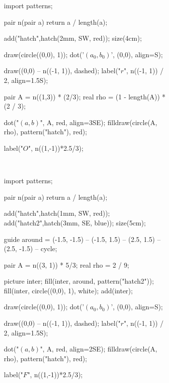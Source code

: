 \begin{figure}[H]
	\centering
	\begin{subfigure}{4cm}
		\centering
		\begin{asy}
			import patterns;

			pair n(pair a) {return a / length(a);}

			add("hatch",hatch(2mm, SW, red));
			size(4cm);

			draw(circle((0,0), 1));
			dot('$(a_0, b_0)$', (0,0), align=S);

			draw((0,0) -- n((-1, 1)), dashed);
			label("$r$", n((-1, 1)) / 2, align=1.5S);

			pair A = n((1,3)) * (2/3);
			real rho = (1 - length(A)) * (2 / 3);

			dot("$(a,b)$", A, red, align=3SE);
			filldraw(circle(A, rho), pattern("hatch"), red);

			label("$O$", n((1,-1))*2.5/3);
		\end{asy}
	\end{subfigure}
	\begin{subfigure}{1cm}
		\centering~\\
	\end{subfigure}
	\begin{subfigure}{5cm}
		\centering
		\begin{asy}
			import patterns;

			pair n(pair a) {return a / length(a);}

			add("hatch",hatch(1mm, SW, red));
			add("hatch2",hatch(3mm, SE, blue));
			size(5cm);

			guide around = (-1.5, -1.5) -- (-1.5, 1.5) -- (2.5, 1.5) -- (2.5, -1.5) -- cycle;

			pair A = n((3, 1)) * 5/3; 
			real rho = 2 / 9;

			picture inter;
			fill(inter, around, pattern("hatch2"));
			fill(inter, circle((0,0), 1), white);
			add(inter);

			draw(circle((0,0), 1));
			dot('$(a_0, b_0)$', (0,0), align=S);

			draw((0,0) -- n((-1, 1)), dashed);
			label("$r$", n((-1, 1)) / 2, align=1.5S);

			dot("$(a,b)$", A, red, align=2SE);
			filldraw(circle(A, rho), pattern("hatch"), red);

			label("$F$", n((1,-1))*2.5/3);
		\end{asy}
	\end{subfigure}
\end{figure}

